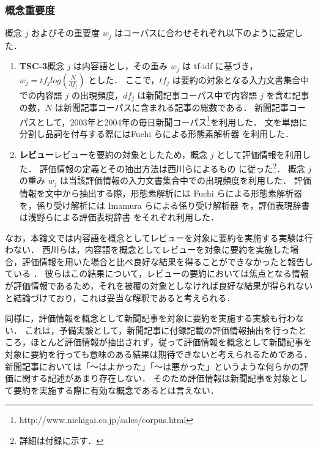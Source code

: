 \documentclass[japanese]{jnlp_1.4}
\begin{document}
\subsubsection{概念重要度}

概念 $ j $ およびその重要度 $ w_{j} $ はコーパスに合わせそれぞれ以下のように設定した．

\begin{enumerate}
\item {\bf TSC-3}\hspace{1zw}概念 $ j $ は内容語とし，その重み $ w_{j} $ は tf-idf \cite{filatova04,clarke07} に基づき，$ w_{j} = tf_{j} log (\frac{N}{df_{j}}) $ とした．
ここで，$ tf_{j} $ は要約の対象となる入力文書集合中での内容語 $ j $ の出現頻度，$ df_{j} $ は新聞記事コーパス中で内容語 $ j $ を含む記事の数，$ N $ は新聞記事コーパスに含まれる記事の総数である．
新聞記事コーパスとして，2003年と2004年の毎日新聞コーパス\footnote{http://www.nichigai.co.jp/sales/corpus.html}を利用した．
文を単語に分割し品詞を付与する際にはFuchi らによる形態素解析器 \cite{fuchi98} を利用した．

\item {\bf レビュー}\hspace{1zw}レビューを要約の対象としたため，概念 $ j $ として評価情報を利用した．
評価情報の定義とその抽出方法は西川らによるもの \cite{nishikawa13} に従った\footnote{詳細は付録に示す．}．
概念 $ j $ の重み $ w_{j} $ は当該評価情報の入力文書集合中での出現頻度を利用した．
評価情報を文中から抽出する際，形態素解析には Fuchi らによる形態素解析器 \cite{fuchi98} を，係り受け解析には Imamura らによる係り受け解析器 \cite{imamura07} を，評価表現辞書は浅野らによる評価表現辞書 \cite{asano08a} をそれぞれ利用した．
\end{enumerate}

なお，本論文では内容語を概念としてレビューを対象に要約を実施する実験は行わない．
西川らは，内容語を概念としてレビューを対象に要約を実施した場合，評価情報を用いた場合と比べ良好な結果を得ることができなかったと報告している \cite{nishikawa13}．
彼らはこの結果について，レビューの要約においては焦点となる情報が評価情報であるため，それを被覆の対象としなければ良好な結果が得られないと結論づけており，これは妥当な解釈であると考えられる．

同様に，評価情報を概念として新聞記事を対象に要約を実施する実験も行わない．
これは，予備実験として，新聞記事に付録記載の評価情報抽出を行ったところ，ほとんど評価情報が抽出されず，従って評価情報を概念として新聞記事を対象に要約を行っても意味のある結果は期待できないと考えられるためである．
新聞記事においては「〜はよかった」「〜は悪かった」というような何らかの評価に関する記述があまり存在しない．
そのため評価情報は新聞記事を対象として要約を実施する際に有効な概念であるとは言えない．
\end{document}

